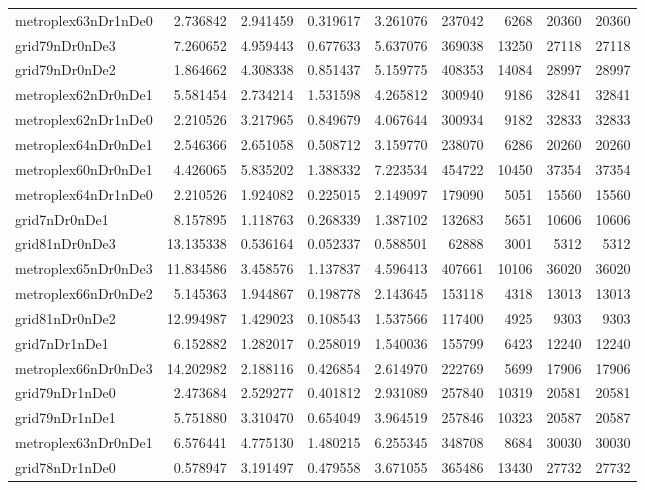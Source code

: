 \begin{longtable}{|l|r|r|r|r|r|r|r|r|}
metroplex63nDr1nDe0 & 2.736842 & 2.941459 & 0.319617 & 3.261076 & 237042 & 6268 & 20360 & 20360 \\
grid79nDr0nDe3 & 7.260652 & 4.959443 & 0.677633 & 5.637076 & 369038 & 13250 & 27118 & 27118 \\
grid79nDr0nDe2 & 1.864662 & 4.308338 & 0.851437 & 5.159775 & 408353 & 14084 & 28997 & 28997 \\
metroplex62nDr0nDe1 & 5.581454 & 2.734214 & 1.531598 & 4.265812 & 300940 & 9186 & 32841 & 32841 \\
metroplex62nDr1nDe0 & 2.210526 & 3.217965 & 0.849679 & 4.067644 & 300934 & 9182 & 32833 & 32833 \\
metroplex64nDr0nDe1 & 2.546366 & 2.651058 & 0.508712 & 3.159770 & 238070 & 6286 & 20260 & 20260 \\
metroplex60nDr0nDe1 & 4.426065 & 5.835202 & 1.388332 & 7.223534 & 454722 & 10450 & 37354 & 37354 \\
metroplex64nDr1nDe0 & 2.210526 & 1.924082 & 0.225015 & 2.149097 & 179090 & 5051 & 15560 & 15560 \\
grid7nDr0nDe1 & 8.157895 & 1.118763 & 0.268339 & 1.387102 & 132683 & 5651 & 10606 & 10606 \\
grid81nDr0nDe3 & 13.135338 & 0.536164 & 0.052337 & 0.588501 & 62888 & 3001 & 5312 & 5312 \\
metroplex65nDr0nDe3 & 11.834586 & 3.458576 & 1.137837 & 4.596413 & 407661 & 10106 & 36020 & 36020 \\
metroplex66nDr0nDe2 & 5.145363 & 1.944867 & 0.198778 & 2.143645 & 153118 & 4318 & 13013 & 13013 \\
grid81nDr0nDe2 & 12.994987 & 1.429023 & 0.108543 & 1.537566 & 117400 & 4925 & 9303 & 9303 \\
grid7nDr1nDe1 & 6.152882 & 1.282017 & 0.258019 & 1.540036 & 155799 & 6423 & 12240 & 12240 \\
metroplex66nDr0nDe3 & 14.202982 & 2.188116 & 0.426854 & 2.614970 & 222769 & 5699 & 17906 & 17906 \\
grid79nDr1nDe0 & 2.473684 & 2.529277 & 0.401812 & 2.931089 & 257840 & 10319 & 20581 & 20581 \\
grid79nDr1nDe1 & 5.751880 & 3.310470 & 0.654049 & 3.964519 & 257846 & 10323 & 20587 & 20587 \\
metroplex63nDr0nDe1 & 6.576441 & 4.775130 & 1.480215 & 6.255345 & 348708 & 8684 & 30030 & 30030 \\
grid78nDr1nDe0 & 0.578947 & 3.191497 & 0.479558 & 3.671055 & 365486 & 13430 & 27732 & 27732 \\

\end{longtable}
